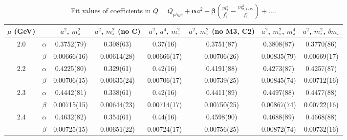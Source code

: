 \documentclass[12pt]{extarticle}
\begin{document}
\begin{table}[h!]
\begin{center}
\begin{tabular}{|c c|c|c|c|c|c|c|}
\hline
$\mu$ (GeV) &  & $a^2$, $m_\pi^2$& $a^2$, $m_\pi^2$ (no C)& $a^2$, $a^4$, $m_\pi^2$& $a^2$, $m_\pi^2$ (no M3, C2)& $a^2$, $m_\pi^2$, $m_\pi^4$& $a^2$, $m_\pi^2$, $\delta m_s$\\
\hline
\multirow{2}{0.5in}{2.0} & $\alpha$ & 0.3752(79)& 0.308(63)& 0.37(16)& 0.3751(87)& 0.3808(87)& 0.3770(86)\\
 & $\beta$ & 0.00666(16)& 0.00614(28)& 0.00666(17)& 0.00706(26)& 0.00835(79)& 0.00669(17)\\
\hline
\multirow{2}{0.5in}{2.2} & $\alpha$ & 0.4225(80)& 0.329(61)& 0.42(16)& 0.4191(88)& 0.4273(87)& 0.4257(87)\\
 & $\beta$ & 0.00706(15)& 0.00635(24)& 0.00706(17)& 0.00739(25)& 0.00845(74)& 0.00712(16)\\
\hline
\multirow{2}{0.5in}{2.3} & $\alpha$ & 0.4442(81)& 0.338(61)& 0.42(16)& 0.4411(89)& 0.4497(88)& 0.4477(88)\\
 & $\beta$ & 0.00715(15)& 0.00644(23)& 0.00714(17)& 0.00750(25)& 0.00867(74)& 0.00722(16)\\
\hline
\multirow{2}{0.5in}{2.4} & $\alpha$ & 0.4632(82)& 0.354(61)& 0.44(16)& 0.4598(90)& 0.4688(89)& 0.4668(88)\\
 & $\beta$ & 0.00725(15)& 0.00651(22)& 0.00724(17)& 0.00756(25)& 0.00872(74)& 0.00732(16)\\
\hline
\end{tabular}
\caption{Fit values of coefficients in $Q = Q_{phys} + \mathbf{\alpha} a^2 + \mathbf{\beta}\left(\frac{m_\pi^2}{f_\pi^2}-\frac{m_{\pi,PDG}^2}{f_\pi^2}\right) + \ldots$.}
\end{center}
\end{table}
























\clearpage
\end{document}
